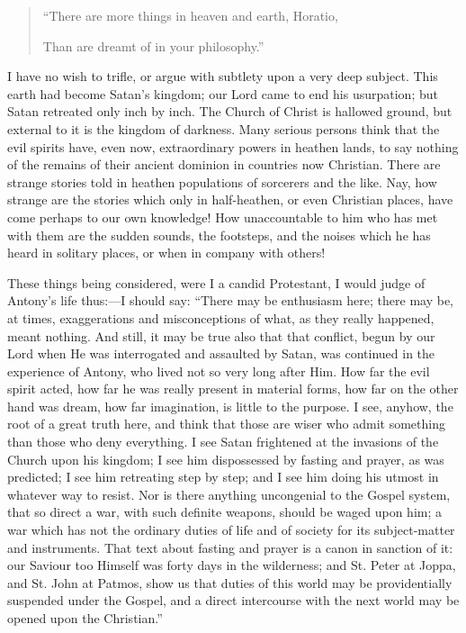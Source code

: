 \begin{quote}

``There are more things in heaven and earth, Horatio,

Than are dreamt of in your philosophy.''

\end{quote}

I have no wish to trifle, or argue with subtlety upon a very deep
subject. This earth had become Satan's kingdom; our Lord came to end
his usurpation; but Satan retreated only inch by inch. The Church of
Christ is hallowed ground, but external to it is the kingdom of
darkness. Many serious persons think that the evil spirits have, even
now, extraordinary powers in heathen lands, to say nothing of the
remains of their ancient dominion in countries now Christian. There
are strange stories told in heathen populations of sorcerers and the
like. Nay, how strange are the stories which only in half-heathen, or
even Christian places, have come perhaps to our own knowledge! How
unaccountable to him who has met with them are the sudden sounds, the
footsteps, and the noises which he has heard in solitary places, or
when in company with others!

These things being considered, were I a candid Protestant, I would
judge of Antony's life thus:—I should say: ``There may be
enthusiasm here; there may be, at times, exaggerations and
misconceptions of what, as they really happened, meant nothing. And
still, it may be true also that that conflict, begun by our Lord when
He was interrogated and assaulted by Satan, was continued in the
experience of Antony, who lived not so very long after Him. How far
the evil spirit acted, how far he was really present in material
forms, how far on the other hand was dream, how far imagination, is
little to the purpose. I see, anyhow, the root of a great truth here,
and think that those are wiser who admit something than those who deny
everything. I see Satan frightened at the invasions of the Church upon
his kingdom; I see him dispossessed by fasting and prayer, as was
predicted; I see him retreating step by step; and I see him doing his
utmost in whatever way to resist. Nor is there anything uncongenial to
the Gospel system, that so direct a war, with such definite weapons,
should be waged upon him; a war which has not the ordinary duties of
life and of society for its subject-matter and instruments. That text
about fasting and prayer is a canon in sanction of it: our Saviour too
Himself was forty days in the wilderness; and St. Peter at Joppa, and
St. John at Patmos, show us that duties of this world may be
providentially suspended under the Gospel, and a direct intercourse
with the next world may be opened upon the Christian.''

